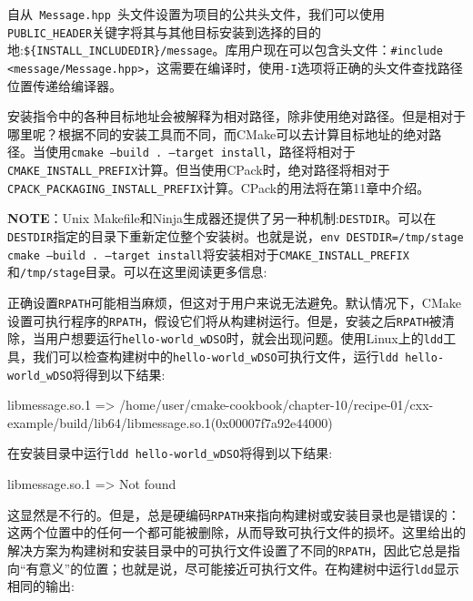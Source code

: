 
自从\texttt{ Message.hpp }头文件设置为项目的公共头文件，我们可以使用\texttt{PUBLIC\_HEADER}关键字将其与其他目标安装到选择的目的地:\texttt{\$\{INSTALL\_INCLUDEDIR\}/message}。库用户现在可以包含头文件：\texttt{\#include <message/Message.hpp>}，这需要在编译时，使用\texttt{-I}选项将正确的头文件查找路径位置传递给编译器。

安装指令中的各种目标地址会被解释为相对路径，除非使用绝对路径。但是相对于哪里呢？根据不同的安装工具而不同，而CMake可以去计算目标地址的绝对路径。当使用\texttt{cmake --build . --target install}，路径将相对于\texttt{CMAKE\_INSTALL\_PREFIX}计算。但当使用CPack时，绝对路径将相对于\texttt{CPACK\_PACKAGING\_INSTALL\_PREFIX}计算。CPack的用法将在第11章中介绍。

\begin{myInfoBox}
\textbf{NOTE}：Unix Makefile和Ninja生成器还提供了另一种机制:\texttt{DESTDIR}。可以在\texttt{DESTDIR}指定的目录下重新定位整个安装树。也就是说，\texttt{env DESTDIR=/tmp/stage cmake --build . --target install}将安装相对于\texttt{CMAKE\_INSTALL\_PREFIX}和\texttt{/tmp/stage}目录。可以在这里阅读更多信息:
\end{myInfoBox}


正确设置\texttt{RPATH}可能相当麻烦，但这对于用户来说无法避免。默认情况下，CMake设置可执行程序的\texttt{RPATH}，假设它们将从构建树运行。但是，安装之后\texttt{RPATH}被清除，当用户想要运行\texttt{hello-world\_wDSO}时，就会出现问题。使用Linux上的\texttt{ldd}工具，我们可以检查构建树中的\texttt{hello-world\_wDSO}可执行文件，运行\texttt{ldd hello-world\_wDSO}将得到以下结果:

\begin{codebox}[shell]
libmessage.so.1 => /home/user/cmake-cookbook/chapter-10/recipe-01/cxx-example/build/lib64/libmessage.so.1(0x00007f7a92e44000)
\end{codebox}

在安装目录中运行\texttt{ldd hello-world\_wDSO}将得到以下结果:

\begin{codebox}[shell]
libmessage.so.1 => Not found
\end{codebox}

这显然是不行的。但是，总是硬编码\texttt{RPATH}来指向构建树或安装目录也是错误的：这两个位置中的任何一个都可能被删除，从而导致可执行文件的损坏。这里给出的解决方案为构建树和安装目录中的可执行文件设置了不同的\texttt{RPATH}，因此它总是指向“有意义”的位置；也就是说，尽可能接近可执行文件。在构建树中运行\texttt{ldd}显示相同的输出:

